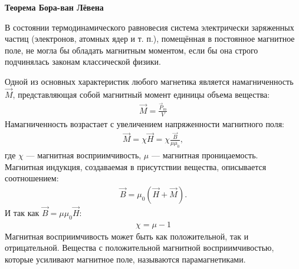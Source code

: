 \documentclass[__minimum__.tex]{subfiles}
\begin{document}
\begin{comment}
+ 1) Закон Киргофа
+ 2) Закон смещения Вина
+ 3) Закон Стефана Больцмана
+ 4) Формула Рэлея-Джинса
+ 5) Формула Планка
+ 6) Соотношение неопределенностей Гейзенберга
+ 7) Постулаты квантовой механики
+ 8) Коммутатор
+ 9) Эрмитов оператор
+ 10) Постулат о вещественных велечинах
+ 11) Постулат об измерениях
+ 12) Наблюдаемый оператор
+ 13) Равенство Парсевалля
+ 14) Квантомеханические средние
+ 15) Временное и стационарное уравнения Шредингера
+ 16) Вектор плотности тока вероятности
+ 17) Теорема Эренфеста
+ 18) Дуальное пространство
+ 19) Коммутационные соотношения
+ 20) Кванто-механический гармонический осцилятор
+ 21) Постулаты Бора
+ 22) Полный и собственный момент импульса
23) Матрицы Паули
\end{comment}


\textbf{Теорема Бора-ван Лёвена}\\
\begin{theorem}
В состоянии термодинамического равновесия система электрически заряженных частиц (электронов, атомных ядер и т. п.), помещённая в постоянное магнитное поле, не могла бы обладать магнитным моментом, если бы она строго подчинялась законам классической физики.
\end{theorem}

Одной из основных характеристик любого магнетика является намагниченность $\vec{M}$, представляющая собой магнитный момент единицы объема вещества:
\begin{gather*}
\vec{M}=\frac{\vec{P}_m}{V}
\end{gather*}
Намагниченность возрастает с увеличением напряженности магнитного поля:
\begin{gather*}
\vec{M}=\chi\vec{H}=\chi\frac{\vec{B}}{\mu\mu_0},
\end{gather*}
где $\chi$ --- магнитная восприимчивость, $\mu$ --- магнитная проницаемость.\\
Магнитная индукция, создаваемая в присутствии вещества, описывается соотношением:
\begin{gather*}
\vec{B}=\mu_0(\vec{H}+\vec{M}).
\end{gather*} 
И так как $\vec{B}=\mu\mu_0 \vec{H}$:
\begin{gather*}
\chi=\mu-1
\end{gather*}
Магнитная восприимчивость может быть как положительной, так и отрицательной. Вещества с положительной магнитной восприимчивостью, которые усиливают магнитное поле, называются парамагнетиками.\\
\end{document}

